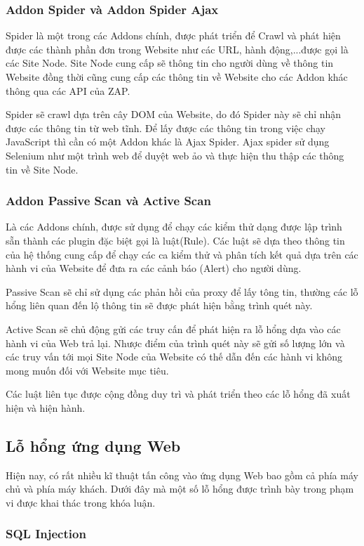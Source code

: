 \documentclass[./../main.tex]{subfiles}
\begin{document}
\subsubsection{Addon Spider và Addon Spider Ajax}
Spider là một trong các Addons chính, được phát triển để Crawl và phát
hiện được các thành phần đơn trong Website như các URL, hành động,...được gọi là các
Site Node. Site Node cung cấp sẽ thông tin cho người dùng về thông tin
Website đồng thời cũng cung cấp các thông tin về Website cho các Addon
khác thông qua các API của ZAP.

Spider sẽ crawl dựa trên cây DOM của Website, do đó Spider này sẽ chỉ nhận
được các thông tin từ web tĩnh. Để lấy được các thông tin trong việc chạy
JavaScript thì cần có một Addon khác là Ajax Spider. Ajax spider sử dụng
Selenium như một trình web để duyệt web ảo và thực hiện thu thập các thông
tin về Site Node.
\subsubsection{Addon Passive Scan và Active Scan}
Là các Addons chính, được sử dụng để chạy các kiểm thử dạng được lập trình
sẵn thành các plugin đặc biệt gọi là luật(Rule). Các luật sẽ dựa theo thông
tin của hệ thống cung cấp để chạy các ca kiểm thử và phân tích kết quả dựa
trên các hành vi của Website để đưa ra các cảnh báo (Alert) cho người dùng.

Passive Scan sẽ chỉ sử dụng các phản hồi của proxy để lấy tông tin, thường
các lỗ hổng liên quan đến lộ thông tin sẽ được phát hiện bằng trình quét này.

Active Scan sẽ chủ động gửi các truy cấn để phát hiện ra lỗ hổng dựa vào
các hành vi của Web trả lại. Nhược điểm của trình quét này sẽ gửi số lượng
lớn và các truy vấn tới mọi Site Node của Website có thế dẫn đến các hành vi
không mong muốn đối với Website mục tiêu.

Các luật liên tục được cộng đồng duy trì và phát triển theo các lỗ hổng
đã xuất hiện và hiện hành.

\subsection{Lỗ hổng ứng dụng Web}

Hiện nay, có rất nhiều kĩ thuật tấn công vào ứng dụng Web bao gồm cả phía
máy chủ và phía máy khách. Dưới đây mà một số lỗ hổng được trình bày trong
phạm vi được khai thác trong khóa luận.

\subsubsection{SQL Injection}
\end{document}
